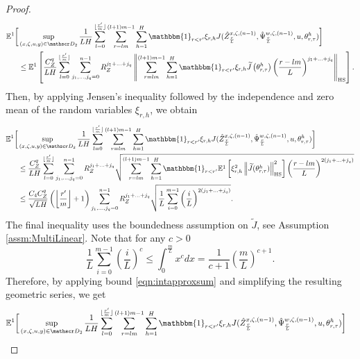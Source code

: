 \documentclass{article}
\begin{document}
\begin{appendices}
\begin{proof}
\begin{align*}
    \mathbb E^1\bigg[&\sup_{(x,\zeta,u ,y )\in \mathscr D_2} \frac{1}{LH}\sum_{l=0}^{\lfloor \frac{r'}{m}\rfloor}\sum_{r=lm}^{(l+1)m-1}\sum_{h=1}^H \mathbbm{1}_{r<r'}\xi_{r,h}J(\hat Z^{x,\zeta,(n-1)}_\frac{r}{L},\hat \Psi^{w,\zeta,(n-1)}_\frac{r}{L},u,\theta^h_{r,\tau})\bigg]\\&\le  \mathbb E^1 \left[ \frac{C_Z^q}{LH}\sum_{l=0}^{\lfloor \frac{r'}{m}\rfloor}\sum_{j_1,\ldots,j_q=0}^{n-1}R_Z^{j_1+\ldots+j_q}\left\Vert\sum_{r=lm}^{(l+1)m-1}\sum_{h=1}^H \mathbbm{1}_{r<r'}\xi_{r,h}\widetilde J\left(\theta^h_{r,\tau}\right)\left(\frac{r-lm}{L}\right)^{j_1+\ldots+j_q}\right\Vert_\mathrm{HS}\right].
\end{align*}
Then, by applying Jensen's inequality followed by the independence and zero mean of the random variables $\xi_{r,h}$, we obtain
\begin{align}
\mathbb E^1 \bigg[&\sup_{(x,\zeta,u ,y )\in \mathscr D_2} \frac{1}{LH}\sum_{l=0}^{\lfloor \frac{r'}{m} \rfloor}\sum_{r=lm}^{(l+1)m-1}\sum_{h=1}^H \mathbbm{1}_{r<r'}\xi_{r,h}J(\hat Z^{x,\zeta,(n-1)}_\frac{r}{L},\hat\Psi^{w,\zeta,(n-1)}_\frac{r}{L},u,\theta^h_{r,\tau})\bigg]
\notag\\& \le\frac{C_Z^q}{LH}\sum_{l=0}^{\lfloor \frac{r'}{m}\rfloor}\sum_{j_1,\ldots,j_q=0}^{n-1}R_Z^{j_1+\ldots+j_q}\sqrt{\sum_{r=lm}^{(l+1)m-1}\sum_{h=1}^H \mathbbm{1}_{r<r'}\mathbb E^1\left[\xi^2_{r,h}\left\Vert \widetilde J(\theta^h_{r,\tau})\right\Vert^{2}_\mathrm{HS}\right]\left(\frac{r-lm}{L}\right)^{2(j_1+\ldots+j_q)}}\notag\\
    & \le\frac{C_4 C_Z^{q}}{\sqrt{LH}}\left(\left\lfloor\frac{r'}{m}\right\rfloor+1\right)\sum_{j_1,\ldots,j_q=0}^{n-1}R_Z^{j_1+\ldots+j_q}\sqrt{ \frac{1}{L}\sum_{i=0}^{m-1}\left(\frac{i}{L} \right)^{2(j_1+\ldots+j_q)} }\notag.
\end{align}
The final inequality uses the boundedness assumption on $\widetilde J$, see Assumption \ref{assm:MultiLinear}. Note that for any $c>0$
\begin{equation}\label{eqn:intapproxsum}
      \frac{1}{L}\sum_{i=0}^{m-1}\left(\frac{i}{L} \right)^{c}\le \int_0^{\frac{m}{L}}x^{c}dx = \frac{1}{c+1}\left(\frac{m}{L}\right)^{c+1}.
\end{equation}
Therefore, by applying bound \eqref{eqn:intapproxsum} and simplifying the resulting geometric series, we get
\begin{align}
\mathbb E^1 \bigg[\sup_{(x,\zeta,u ,y )\in \mathscr D_2} \frac{1}{LH}&\sum_{l=0}^{\lfloor \frac{r'}{m} \rfloor}\sum_{r=lm}^{(l+1)m-1}\sum_{h=1}^H \mathbbm{1}_{r<r'}\xi_{r,h}J(\hat Z^{x,\zeta,(n-1)}_\frac{r}{L},\hat\Psi^{w,\zeta,(n-1)}_\frac{r}{L},u,\theta^h_{r,\tau})\bigg]

\end{align}
\end{proof}
\end{appendices}
\end{document}
